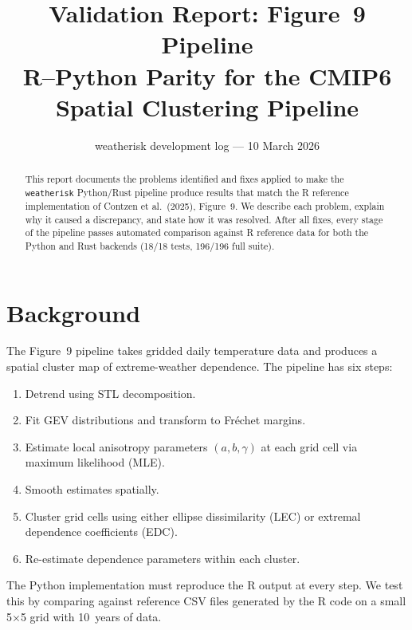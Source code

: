 \documentclass[12pt,a4paper]{article}
\title{Validation Report: Figure~9 Pipeline\\[4pt]
  \large R--Python Parity for the CMIP6 Spatial Clustering Pipeline}
\author{weatherisk development log --- 10 March 2026}
\date{}
\begin{document}
\maketitle

\begin{abstract}
This report documents the problems identified and fixes applied to
make the \texttt{weatherisk} Python/Rust pipeline produce results
that match the R reference implementation of Contzen et al.\ (2025),
Figure~9.  We describe each problem, explain why it caused a
discrepancy, and state how it was resolved.  After all fixes, every
stage of the pipeline passes automated comparison against R reference
data for both the Python and Rust backends (18/18 tests, 196/196 full
suite).
\end{abstract}

\tableofcontents
\newpage

\section{Background}

The Figure~9 pipeline takes gridded daily temperature data and
produces a spatial cluster map of extreme-weather dependence.
The pipeline has six steps:

\begin{enumerate}[nosep]
  \item Detrend using STL decomposition.
  \item Fit GEV distributions and transform to Fr\'echet margins.
  \item Estimate local anisotropy parameters $(a, b, \gamma)$ at
        each grid cell via maximum likelihood (MLE).
  \item Smooth estimates spatially.
  \item Cluster grid cells using either ellipse dissimilarity (LEC)
        or extremal dependence coefficients (EDC).
  \item Re-estimate dependence parameters within each cluster.
\end{enumerate}

The Python implementation must reproduce the R output at every step.
We test this by comparing against reference CSV files generated by
the R code on a small 5$\times$5 grid with 10~years of data.

\end{document}
